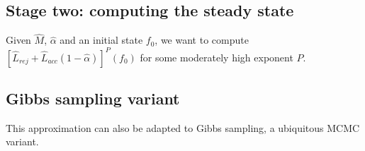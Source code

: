 \documentclass{article}
\begin{document}
\subsection{Stage two: computing the steady state}
 Given $\hat{M}$, $\hat{\alpha}$ and an initial state $f_0$, we want to compute $[\hat{L}_{rej}+\hat{L}_{acc}(1-\hat{\alpha})]^P(f_0)$ for some moderately high exponent $P$.

\subsection{Gibbs sampling variant}
This approximation can also be adapted to Gibbs sampling, a ubiquitous MCMC variant. 



\end{document}
